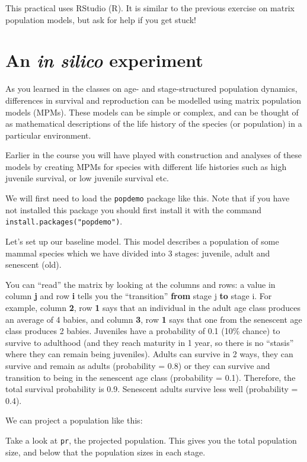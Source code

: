 \documentclass[
  a4paper]{book}
\begin{document}
This practical uses RStudio (R). It is similar to the previous exercise on matrix population models, but ask for help if you get stuck!

\section{\texorpdfstring{An \emph{in silico} experiment}{An in silico experiment}}\label{an-in-silico-experiment}

As you learned in the classes on age- and stage-structured population dynamics, differences in survival and reproduction can be modelled using matrix population models (MPMs). These models can be simple or complex, and can be thought of as mathematical descriptions of the life history of the species (or population) in a particular environment.

Earlier in the course you will have played with construction and analyses of these models by creating MPMs for species with different life histories such as high juvenile survival, or low juvenile survival etc.

We will first need to load the \texttt{popdemo} package like this. Note that if you have not installed this package you should first install it with the command \texttt{install.packages("popdemo")}.

Let's set up our baseline model. This model describes a population of some mammal species which we have divided into 3 stages: juvenile, adult and senescent (old).

You can ``read'' the matrix by looking at the columns and rows: a value in column \textbf{j} and row \textbf{i} tells you the ``transition'' \textbf{from} stage j \textbf{to} stage i. For example, column \textbf{2}, row \textbf{1} says that an individual in the adult age class produces an average of 4 babies, and column \textbf{3}, row \textbf{1} says that one from the senescent age class produces 2 babies. Juveniles have a probability of 0.1 (10\% chance) to survive to adulthood (and they reach maturity in 1 year, so there is no ``stasis'' where they can remain being juveniles). Adults can survive in 2 ways, they can survive and remain as adults (probability = 0.8) or they can survive and transition to being in the senescent age class (probability = 0.1). Therefore, the total survival probability is 0.9. Senescent adults survive less well (probability = 0.4).

We can project a population like this:

Take a look at \texttt{pr}, the projected population. This gives you the total population size, and below that the population sizes in each stage.
\end{document}
